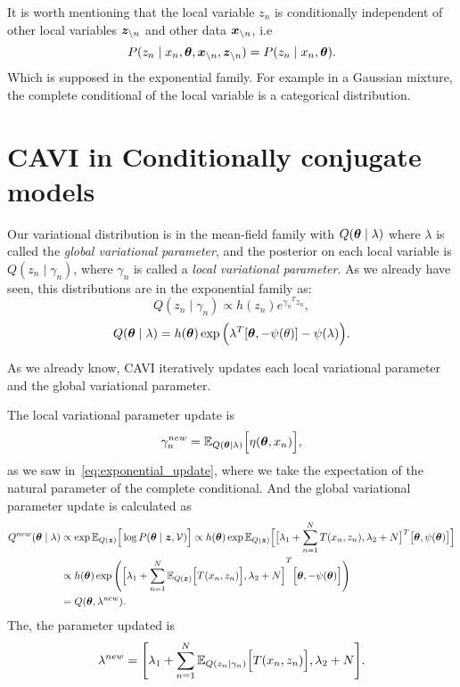 It is worth mentioning that the local variable \(z_{n}\) is conditionally independent of other local variables \(\bm{z}_{\backslash n}\)  and other data \(\bm{x}_{\backslash n}\), i.e
\[
  P(z_{n} \mid x_{n}, \bm{\theta}, \bm{x}_{\backslash n}, \bm{z}_{\backslash n}) = P(z_{n} \mid x_{n}, \bm{\theta}).
\]
Which is supposed in the exponential family. For example in a Gaussian mixture, the complete conditional of the local variable is a categorical distribution.


\section{CAVI in Conditionally conjugate models} \label{sec:cavi_ccm}

Our variational distribution is in the mean-field family with \(Q(\bm{\theta} \mid \lambda)\) where \(\lambda\) is called the \emph{global variational parameter}, and the posterior on each local variable is \(Q(z_{n} \mid \gamma_{n})\), where \(\gamma_{n}\) is called a \emph{local variational parameter}.
As we already have seen, this distributions are in the exponential family as:
\[
  Q(z_{n} \mid \gamma_{n}) \propto h(z_{n})e^{{\gamma_{n}}^{T}z_{n}},
\]
\[
  Q(\bm{\theta} \mid \lambda) = h(\bm{\theta}) \exp \Big( {\lambda}^{T}[\bm{\theta}, -\psi(\theta)] - \psi(\lambda) \Big).
\]

As we already know, CAVI iteratively updates each local variational parameter and the global variational parameter.

The local variational parameter update is
\[
  \gamma_{n}^{new} = \mathbb{E}_{Q(\bm{\theta} \mid \lambda)}\Big[\eta(\bm{\theta}, x_{n})\Big],
\]
as we saw in~\ref{eq:exponential_update}, where we take the expectation of the natural parameter of the complete conditional. And the global variational parameter update is calculated as
\[
  \begin{aligned}
    Q^{new}(\bm{\theta} \mid \lambda) &\propto \exp \mathbb{E}_{Q(\bm{z})}\Big[\log P(\bm{\theta} \mid \bm{z} , \mathcal{V})\Big] \propto h(\bm{\theta}) \exp \mathbb{E}_{Q(\bm{z})}\Big[\big[  \lambda_{1} + \sum_{n=1}^{N}T(x_{n}, z_{n}), \lambda_{2} + N \big]^{T}\big[ \bm{\theta}, \psi(\bm{\theta}) \big]\Big]\\
    &\propto h(\bm{\theta}) \exp \Bigg( {\Big[  \lambda_{1} + \sum_{n=1}^{N}\mathbb{E}_{Q(\bm{z})}\Big[T(x_{n}, z_{n})\Big], \lambda_{2} + N \Big]}^{T}\Big[ \bm{\theta}, - \psi(\bm{\theta}) \Big]\Bigg)\\
    &= Q(\bm{\theta}, \lambda^{new}).
  \end{aligned}
\]
The, the parameter updated is
\[
  \lambda^{new} = \Bigg[ \lambda_{1} + \sum_{n=1}^{N} \mathbb{E}_{Q(z_{n}\mid \gamma_{n})}\Big[T(x_{n},z_{n})\Big], \lambda_{2} + N \Bigg].
\]

